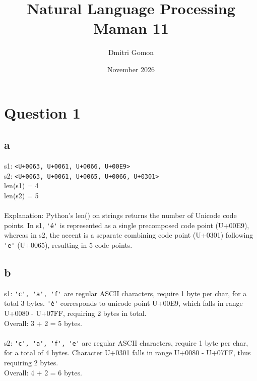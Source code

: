 \documentclass{article}
\title{Natural Language Processing \\ \large Maman 11}
\author{Dmitri Gomon}
\date{November 2026}
\numberwithin{equation}{section}
\begin{document}
    \maketitle

    \section*{Question 1}
    \subsection*{a}
    s1: \verb|<U+0063, U+0061, U+0066, U+00E9>| \\
    s2: \verb|<U+0063, U+0061, U+0065, U+0066, U+0301>| \\
    len(s1) = 4 \\
    len(s2) = 5 \\
    \\
    Explanation:
    Python's len() on strings returns the number of Unicode code points.
    In s1, \verb|'é'| is represented as a single precomposed code point (U+00E9),
    whereas in s2, the accent is a separate combining code point (U+0301)
    following \verb|'e'| (U+0065), resulting in 5 code points.

    \subsection*{b}
    s1: \verb|'c', 'a', 'f'| are regular ASCII characters, require 1 byte per char, for a total 3 bytes.
    \verb|'é'| corresponds to unicode point U+00E9, which falls in range U+0080 - U+07FF, requiring 2
    bytes in total. \\
    Overall: 3 + 2 = 5 bytes.\\
    \\
    s2: \verb|'c', 'a', 'f', 'e'| are regular ASCII characters, require 1 byte per char, for a total of
    4 bytes. Character U+0301 falls in range U+0080 - U+07FF, thus requiring 2 bytes. \\
    Overall: 4 + 2 = 6 bytes.\\
\end{document}

